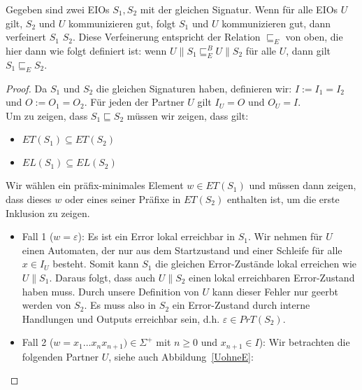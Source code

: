 \begin{lem}
  Gegeben sind zwei EIOs $S_1, S_2$ mit der gleichen Signatur. Wenn
  für alle EIOs $U$ gilt, $S_2$ und $U$ kommunizieren gut, folgt $S_1$
  und $U$ kommunizieren gut, dann verfeinert $S_1$ $S_2$. Diese Verfeinerung
  entspricht der Relation $\sqsubseteq _E$ von oben, die hier dann wie folgt
  definiert ist: wenn $U\|S_1 \sqsubseteq _E^B U\|S_2$ für alle $U$, dann gilt
  $S_1\sqsubseteq _E S_2$.
\end{lem}

\begin{proof}
  Da $S_1$ und $S_2$ die gleichen Signaturen haben, definieren wir:
  $I:=I_1=I_2$ und $O:=O_1=O_2$. Für jeden der Partner $U$ gilt $I_U=O$ und
  $O_U=I$.\\
  Um zu zeigen, dass $S_1\sqsubseteq S_2$ müssen wir zeigen, dass gilt:
  \begin{itemize}
    \item $ET(S_1)\subseteq ET(S_2)$
    \item $EL(S_1)\subseteq EL(S_2)$
  \end{itemize}
  Wir wählen ein präfix-minimales Element $w\in ET(S_1)$ und müssen dann
  zeigen, dass dieses $w$ oder eines seiner Präfixe in $ET(S_2)$ enthalten ist,
  um
  die erste Inklusion zu zeigen.
  \begin{itemize}
    \item Fall 1 ($w=\varepsilon$): Es ist ein Error lokal erreichbar in $S_1$.
      Wir nehmen für $U$ einen Automaten, der nur aus dem Startzustand und
      einer Schleife für alle $x\in I_U$ besteht. Somit kann $S_1$ die gleichen
      Error-Zustände lokal erreichen wie $U\|S_1$. Daraus folgt, dass auch
      $U\|S_2$ einen lokal erreichbaren Error-Zustand haben muss. Durch unsere
      Definition von $U$ kann dieser Fehler nur geerbt werden von $S_2$. Es
      muss also in $S_2$ ein Error-Zustand durch interne Handlungen und Outputs
      erreichbar sein, d.h. $\varepsilon\in PrT(S_2)$.
    \item Fall 2 ($w=x_1\dots x_n x_{n+1})\in\Sigma ^+$ mit $n\geq 0$ und
      $x_{n+1}\in I$): Wir betrachten die folgenden Partner $U$, siehe auch
      Abbildung~\ref{UohneE}:
\end{itemize}
\end{proof}
